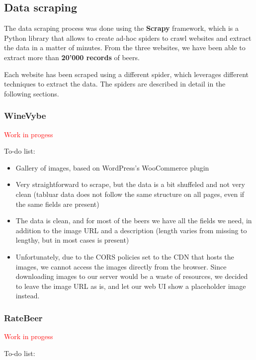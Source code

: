 \subsection{Data scraping}

The data scraping process was done using the \textbf{Scrapy} framework, which is a Python library that allows to create ad-hoc spiders to crawl websites and extract the data in a matter of minutes. From the three websites, we have been able to extract more than \textbf{20'000 records} of beers.

Each website has been scraped using a different spider, which leverages different techniques to extract the data. The spiders are described in detail in the following sections.

\subsubsection{WineVybe}

\textcolor{red}{Work in progess}

To-do list:

\begin{itemize}
  \item Gallery of images, based on WordPress's WooCommerce plugin
  \item Very straightforward to scrape, but the data is a bit shuffeled and not very clean (tabluar data does not follow the same structure on all pages, even if the same fields are present)
  \item The data is clean, and for most of the beers we have all the fields we need, in addition to the image URL and a description (length varies from missing to lengthy, but in most cases is present)
  \item Unfortunately, due to the CORS policies set to the CDN that hosts the images, we cannot access the images directly from the browser. Since downloading images to our server would be a waste of resources, we decided to leave the image URL as is, and let our web UI show a placeholder image instead.
\end{itemize}

\subsubsection{RateBeer}

\textcolor{red}{Work in progess}

To-do list:

